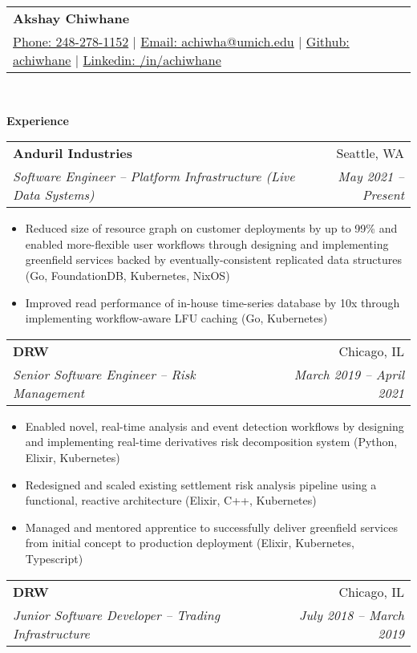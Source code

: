 \documentclass[letterpaper,11pt]{article}
\makeatletter
\newcommand{\resitem}[1]{\item #1 \vspace{-2pt}}
\newcommand{\resheading}[1]{{\large \colorbox{mygrey}{\begin{minipage}{\textwidth}{\textbf{#1 \vphantom{p\^{E}}}}\end{minipage}}}}
\newcommand{\ressubheading}[4]{
\begin{tabular*}{6.875in}{l@{\extracolsep{\fill}}r}
		\textbf{#1} & #2 \\
		\textit{#3} & \textit{#4} \\
\end{tabular*}\vspace{-6pt}}
\renewcommand{\footnotesize}{\fontsize{10pt}{11pt}\selectfont}
\makeatother
\begin{document}
\newcommand{\mywebheader}{
	\begin{tabular*}{7in}{l@{\extracolsep{\fill}}r}
		\textbf{{\LARGE Akshay Chiwhane}} \\
		\href{tel:248-278-1152}{Phone: 248-278-1152} |
		\href{mailto:achiwha@umich.edu}{Email: achiwha@umich.edu} |
		\href{https://github.com/achiwhane}{Github: achiwhane} |
		\href{https://linkedin.com/in/achiwhane}{Linkedin: /in/achiwhane}	\end{tabular*}
		\\
		\vspace{0.1in}}
						
		\mywebheader
						

						
		\resheading{Experience}
		\begin{description}
			\item
			\ressubheading{Anduril Industries}{Seattle, WA}
			{Software Engineer -- Platform Infrastructure (Live Data Systems)}{May 2021 -- Present}
			{	
				\footnotesize
				\begin{itemize}
					\resitem{Reduced size of resource graph on customer deployments by up to 99\% and enabled more-flexible user workflows through designing and implementing greenfield services backed by eventually-consistent replicated data structures  (Go, FoundationDB, Kubernetes, NixOS)}
					\resitem{Improved read performance of in-house time-series database by 10x through implementing workflow-aware LFU caching (Go, Kubernetes)} 
				\end{itemize}
			}
			\item
			\ressubheading{DRW}{Chicago, IL}
			{Senior Software Engineer -- Risk Management}{March 2019 -- April 2021}
			{	
				\footnotesize
				\begin{itemize}
					\resitem{Enabled novel, real-time analysis and event detection workflows by designing and implementing real-time derivatives risk decomposition system  (Python, Elixir, Kubernetes)}
					\resitem{Redesigned and scaled existing settlement risk analysis pipeline using a functional, reactive architecture (Elixir, C++, Kubernetes)}
					\resitem{Managed and mentored apprentice to successfully deliver greenfield services from initial concept to production deployment (Elixir, Kubernetes, Typescript) }
				\end{itemize}
			}
			\item
			\ressubheading{DRW}{Chicago, IL}
			{Junior Software Developer -- Trading Infrastructure}{July 2018 -- March 2019}

\end{description}
\end{document}
